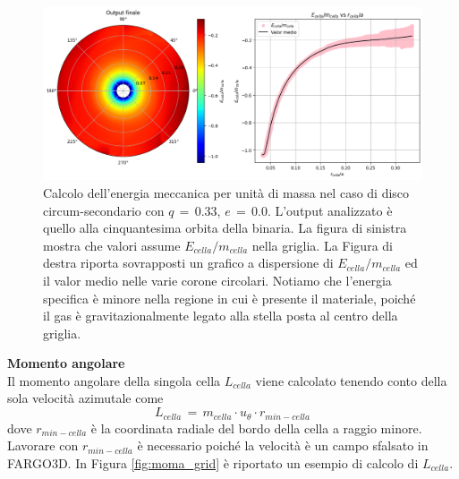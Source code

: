 \begin{figure}[h]
    \centering
    \includegraphics[width=\textwidth]{Immagini/Simulazioni/cal_ene.png}
    \caption{Calcolo dell'energia meccanica per unità di massa nel caso di disco circum-secondario con $q\,=\,0.33$, $e\,=\,0.0$. L'output analizzato è quello alla cinquantesima orbita della binaria. La figura di sinistra mostra che valori assume $E_{cella}/m_{cella}$ nella griglia. La Figura di destra riporta sovrapposti un grafico a dispersione di $E_{cella}/m_{cella}$ ed il valor medio nelle varie corone circolari. Notiamo che l'energia specifica è minore nella regione in cui è presente il materiale, poiché il gas è gravitazionalmente legato alla stella posta al centro della griglia.}
    \label{fig:ene_grid}
\end{figure}

\textbf{Momento angolare}\\

Il momento angolare della singola cella $L_{cella}$ viene calcolato tenendo conto della sola velocità azimutale come
\begin{equation}
L_{cella}\,=\,m_{cella} \cdot u_\theta \cdot r_{min-cella}
\label{eq:moma_cella}
\end{equation}
dove $r_{min-cella}$ è la coordinata radiale del bordo della cella a raggio minore. Lavorare con $r_{min-cella}$ è necessario poiché la velocità è un campo sfalsato in FARGO3D. In Figura \ref{fig:moma_grid} è riportato un esempio di calcolo di $L_{cella}$.

